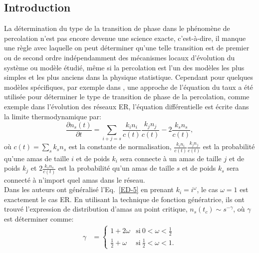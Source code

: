 \subsection{Introduction}
La détermination du type de la transition de phase dans le phénomène de percolation n'est pas encore devenue une science exacte, c'est-à-dire, il manque une règle avec laquelle on peut déterminer qu'une telle transition est de premier ou de second ordre indépendamment des mécanismes locaux d'évolution du système ou modèle étudié, même si la percolation est l'un des modèles les plus simples et les plus anciens dans la physique statistique. Cependant pour quelques modèles spécifiques, par exemple dans \cite{Ziff-al1983}, une approche de l'équation du taux a été utilisée pour déterminer le type de transition de phase de la percolation, comme exemple dans l'évolution des réseaux ER, l'équation différentielle est écrite dans la limite thermodynamique par:
\begin{equation}
\frac{\partial n_s(t)}{\partial t}=\sum_{i+j=s}\frac{k_in_i}{c(t)}\frac{k_jn_j}{c(t)}-2\frac{k_sn_s}{c(t)},
\label{ED-5}
\end{equation}
où $c(t)=\sum_{s}k_sn_s$ est la constante de normalisation, $\frac{k_in_i}{c(t)}\frac{k_jn_j}{c(t)}$ est la probabilité qu'une amas de taille $i$ et de poids $k_i$ sera connecte à un amas de taille $j$ et de poids $k_j$ et $2\frac{k_sn_s}{c(t)}$ est la probabilité qu'un amas de taille $s$ et de poids $k_s$ sera connecté à n'import quel amas dans le réseau.\\
Dans \cite{Cho-al2010,Cho2-Kahng2011} les auteurs ont généralisé l'Eq.~\eqref{ED-5} en prenant $k_i=i^{\omega}$, le cas $\omega=1$ est exactement le cas ER. En utilisant la technique de fonction génératrice, ils ont trouvé l'expression de distribution d'amas au point critique, $n_s(t_c)\sim s^{-\gamma}$, où $\gamma$ est déterminer comme:
\begin{align}
\gamma &=
\begin{cases}
1+2\omega & \text{si}\ 0<\omega<\frac{1}{2} \\
 \frac{1}{2}+\omega& \text{si}\ \frac{1}{2}<\omega<1.
\end{cases}
\label{gama}
\end{align}

